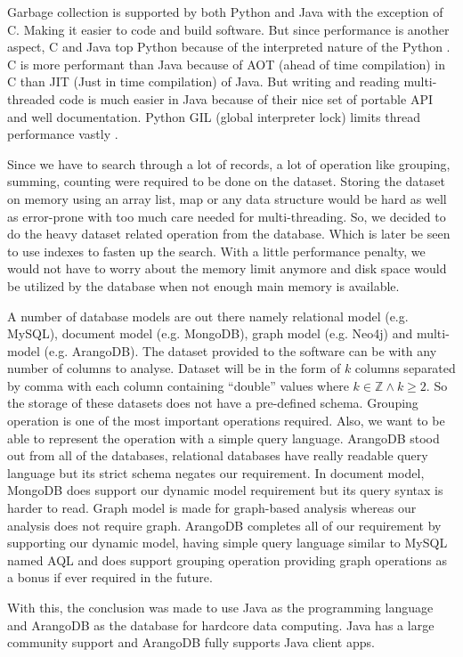 Garbage collection is supported by both Python and Java with the exception of C. Making it easier to code and build software. But since performance is another aspect, C and Java top Python because of the interpreted nature of the Python \cite{hugunin1997Python}. C is more performant than Java because of AOT (ahead of time compilation) in C than JIT (Just in time compilation) of Java. But writing and reading multi-threaded code is much easier in Java because of their nice set of portable API and well documentation. Python GIL (global interpreter lock) limits thread performance vastly \cite{beazley2010understanding}.

Since we have to search through a lot of records, a lot of operation like grouping, summing, counting were required to be done on the dataset. Storing the dataset on memory using an array list, map or any data structure would be hard as well as error-prone with too much care needed for multi-threading. So, we decided to do the heavy dataset related operation from the database. Which is later be seen to use indexes to fasten up the search. With a little performance penalty, we would not have to worry about the memory limit anymore and disk space would be utilized by the database when not enough main memory is available. 

A number of database models are out there namely relational model (e.g. MySQL), document model (e.g. MongoDB), graph model (e.g. Neo4j) and multi-model (e.g. ArangoDB). The dataset provided to the software can be with any number of columns to analyse. Dataset will be in the form of \(k\) columns separated by comma with each column containing ``double'' values where \(k \in \mathbb{Z} \wedge k \geq 2\). So the storage of these datasets does not have a pre-defined schema. Grouping operation is one of the most important operations required. Also, we want to be able to represent the operation with a simple query language. ArangoDB stood out from all of the databases, relational databases have really readable query language but its strict schema negates our requirement. In document model, MongoDB does support our dynamic model requirement but its query syntax is harder to read. Graph model is made for graph-based analysis whereas our analysis does not require graph. ArangoDB completes all of our requirement by supporting our dynamic model, having simple query language similar to MySQL named AQL and does support grouping operation providing graph operations as a bonus if ever required in the future.

With this, the conclusion was made to use Java as the programming language and ArangoDB as the database for hardcore data computing. Java has a large community support and ArangoDB fully supports Java client apps.

